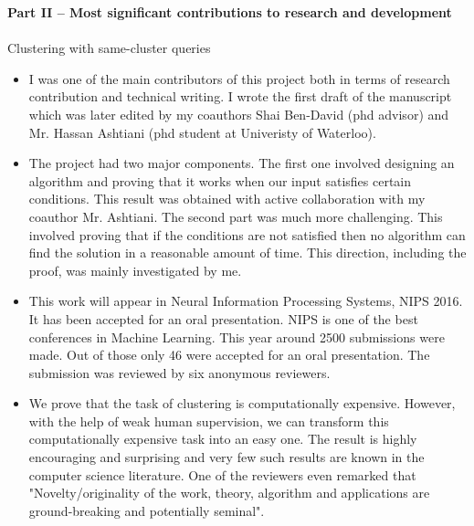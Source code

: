 \documentclass[12pt]{article}
\begin{document}
\noindent\textbf{Part II – Most significant contributions to research and development}\\\\
Clustering with same-cluster queries
\begin{itemize}[noitemsep]
\item I was one of the main contributors of this project both in terms of research contribution and technical writing. I wrote the first draft of the manuscript which was later edited by my coauthors Shai Ben-David (phd advisor) and Mr. Hassan Ashtiani (phd student at Univeristy of Waterloo). 
\item The project had two major components. The first one involved designing an algorithm and proving that it works when our input satisfies certain conditions. This result was obtained with active collaboration with my coauthor Mr. Ashtiani. The second part was much more challenging. This involved proving that if the conditions are not satisfied then no algorithm can find the solution in a reasonable amount of time. This direction, including the proof, was mainly investigated by me.
\item This work will appear in Neural Information Processing Systems, NIPS 2016. It has been accepted for an oral presentation. NIPS is one of the best conferences in Machine Learning. This year around 2500 submissions were made. Out of those only 46 were accepted for an oral presentation. The submission was reviewed by six anonymous reviewers.
\item We prove that the task of clustering is computationally expensive. However, with the help of weak human supervision, we can transform this computationally expensive task into an easy one. The result is highly encouraging and surprising and very few such results are known in the computer science literature. One of the reviewers even remarked that "Novelty/originality of the work, theory, algorithm and applications are ground-breaking and potentially seminal". 
\end{itemize}
\end{document}
